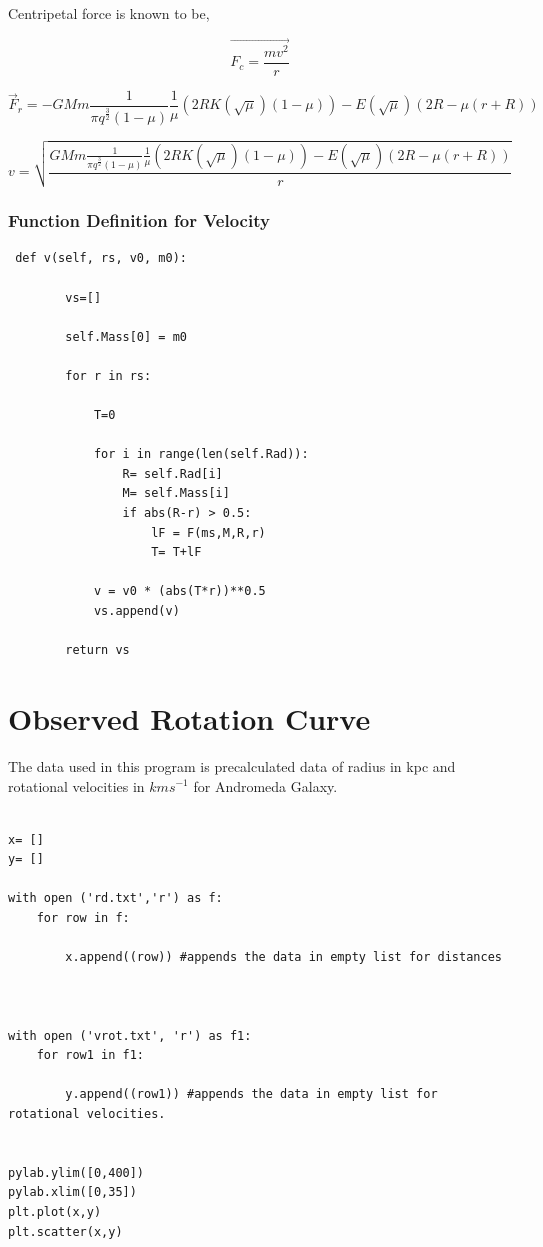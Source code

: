 Centripetal force is known to be,

\begin{center}
\begin{equation}
\vec{F_{c} = \frac{m v^2 }{r}}
\end{equation}

\begin{equation}
\vec{F}_{r} = - GMm \frac{1}{\pi q^ \frac{3}{2} (1- \mu)} \frac{1}{\mu} (2 R K(\sqrt{\mu}) (1 - \mu))- E (\sqrt{\mu}) (2 R - \mu (r + R))
\end{equation}

\begin{equation}
v = \sqrt{\frac{GMm \frac{1}{\pi q^ \frac{3}{2} (1- \mu)} \frac{1}{\mu} (2 R K(\sqrt{\mu}) (1 - \mu))- E (\sqrt{\mu}) (2 R - \mu (r + R))}{r}}
\end{equation}

\end{center}

\subsubsection{Function Definition for Velocity}
\begin{verbatim}
 def v(self, rs, v0, m0):

        vs=[]

        self.Mass[0] = m0

        for r in rs:

            T=0

            for i in range(len(self.Rad)):
                R= self.Rad[i]
                M= self.Mass[i]
                if abs(R-r) > 0.5:
                    lF = F(ms,M,R,r)
                    T= T+lF

            v = v0 * (abs(T*r))**0.5
            vs.append(v)

        return vs
\end{verbatim}


\section{Observed Rotation Curve}

The data used in this program is precalculated data of radius in kpc and rotational velocities in $kms^{-1}$ for Andromeda Galaxy.\cite{observed} 
\begin{verbatim}

x= []
y= []

with open ('rd.txt','r') as f:
    for row in f:

        x.append((row)) #appends the data in empty list for distances



with open ('vrot.txt', 'r') as f1:
    for row1 in f1:

        y.append((row1)) #appends the data in empty list for rotational velocities.


pylab.ylim([0,400])
pylab.xlim([0,35])
plt.plot(x,y)
plt.scatter(x,y)


\end{verbatim}

